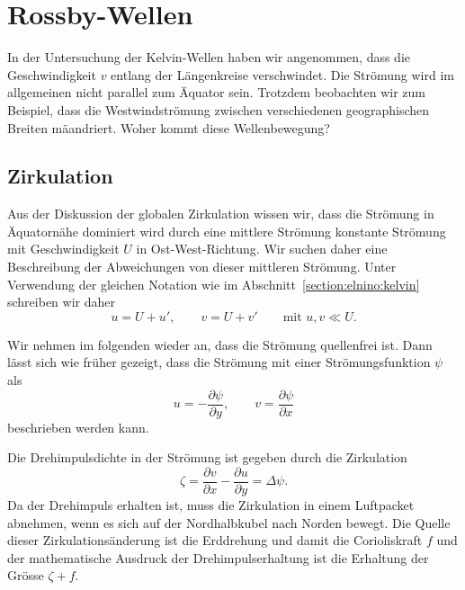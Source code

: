 %
%
%

\section{Rossby-Wellen\label{section:elnino:rossby}}
In der Untersuchung der Kelvin-Wellen haben wir angenommen, dass die
Geschwindigkeit $v$ entlang der Längenkreise verschwindet.
Die Strömung wird im allgemeinen nicht parallel zum Äquator sein.
Trotzdem beobachten wir zum Beispiel, dass die Westwindströmung 
zwischen verschiedenen geographischen Breiten mäandriert.
Woher kommt diese Wellenbewegung?

\subsection{Zirkulation\label{subsection:rossby:zirkulation}}
Aus der Diskussion der globalen Zirkulation wissen wir, dass die
Strömung in Äquatornähe dominiert wird durch eine mittlere Strömung
konstante Strömung mit Geschwindigkeit $U$ in Ost-West-Richtung.
Wir suchen daher eine Beschreibung der Abweichungen von dieser
mittleren Strömung.
Unter Verwendung der gleichen Notation wie im
Abschnitt~\ref{section:elnino:kelvin} schreiben wir daher
\[
u=U+u',\qquad v=U+v'\qquad\text{mit $u,v\ll U$}.
\]


Wir nehmen im folgenden wieder an, dass die Strömung quellenfrei ist.
Dann lässt sich wie früher gezeigt, dass die Strömung mit einer
Strömungsfunktion $\psi$ als
\[
u=-\frac{\partial \psi}{\partial y},\qquad
v=\frac{\partial\psi}{\partial x}
\]
beschrieben werden kann.

Die Drehimpulsdichte in der Strömung ist gegeben durch die Zirkulation
\[
\zeta
=
\frac{\partial v}{\partial x} - \frac{\partial u}{\partial y}
=
\Delta \psi.
\]
Da der Drehimpuls erhalten ist, muss die Zirkulation in einem
Luftpacket abnehmen, wenn es sich auf der Nordhalbkubel nach Norden
bewegt.
Die Quelle dieser Zirkulationsänderung ist die Erddrehung und damit
die Corioliskraft $f$ und der mathematische Ausdruck der Drehimpulserhaltung
ist die Erhaltung der Grösse $\zeta+f$.

